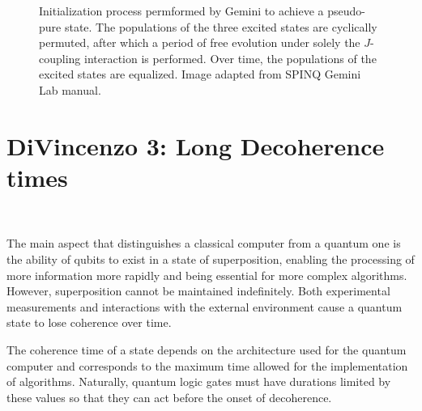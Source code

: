 \begin{figure}[ht]
\label{fig:geminipermutation}
\caption{Initialization process permformed by Gemini to achieve a pseudo-pure state. The populations of the three excited states are cyclically permuted, after which a period of free evolution under solely the \(J\)-coupling interaction is performed. Over time, the populations of the excited states are equalized. Image adapted from SPINQ Gemini Lab manual.}
\end{figure}

\newpage
\section{DiVincenzo 3: Long Decoherence times}
~\label{sec:Divincenzo3}

The main aspect that distinguishes a classical computer from a quantum one is the ability of qubits to exist in a state of superposition, enabling the processing of more information more rapidly and being essential for more complex algorithms. However, superposition cannot be maintained indefinitely. Both experimental measurements and interactions with the external environment cause a quantum state to lose coherence over time.

The coherence time of a state depends on the architecture used for the quantum computer and corresponds to the maximum time allowed for the implementation of algorithms. Naturally, quantum logic gates must have durations limited by these values so that they can act before the onset of decoherence.

